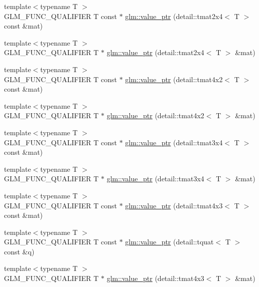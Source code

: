\begin{DoxyCompactItemize}
\item 
{\footnotesize template$<$typename T $>$ }\\G\+L\+M\+\_\+\+F\+U\+N\+C\+\_\+\+Q\+U\+A\+L\+I\+F\+I\+E\+R T const $\ast$ \hyperlink{group__gtc__type__ptr_ga6b5545ede3accc40f90aa05014406bcf}{glm\+::value\+\_\+ptr} (detail\+::tmat2x4$<$ T $>$ const \&mat)
\item 
{\footnotesize template$<$typename T $>$ }\\G\+L\+M\+\_\+\+F\+U\+N\+C\+\_\+\+Q\+U\+A\+L\+I\+F\+I\+E\+R T $\ast$ \hyperlink{group__gtc__type__ptr_gad3ffa3b03348e1c71b509023d0e48436}{glm\+::value\+\_\+ptr} (detail\+::tmat2x4$<$ T $>$ \&mat)
\item 
{\footnotesize template$<$typename T $>$ }\\G\+L\+M\+\_\+\+F\+U\+N\+C\+\_\+\+Q\+U\+A\+L\+I\+F\+I\+E\+R T const $\ast$ \hyperlink{group__gtc__type__ptr_ga8278dac512c3e2c638b6713d63c728bb}{glm\+::value\+\_\+ptr} (detail\+::tmat4x2$<$ T $>$ const \&mat)
\item 
{\footnotesize template$<$typename T $>$ }\\G\+L\+M\+\_\+\+F\+U\+N\+C\+\_\+\+Q\+U\+A\+L\+I\+F\+I\+E\+R T $\ast$ \hyperlink{group__gtc__type__ptr_gab70c3bd4e9be92b0c9b9668744f0b5c8}{glm\+::value\+\_\+ptr} (detail\+::tmat4x2$<$ T $>$ \&mat)
\item 
{\footnotesize template$<$typename T $>$ }\\G\+L\+M\+\_\+\+F\+U\+N\+C\+\_\+\+Q\+U\+A\+L\+I\+F\+I\+E\+R T const $\ast$ \hyperlink{group__gtc__type__ptr_gaa38c5a2be6c64a69e7e5d64b70137e1c}{glm\+::value\+\_\+ptr} (detail\+::tmat3x4$<$ T $>$ const \&mat)
\item 
{\footnotesize template$<$typename T $>$ }\\G\+L\+M\+\_\+\+F\+U\+N\+C\+\_\+\+Q\+U\+A\+L\+I\+F\+I\+E\+R T $\ast$ \hyperlink{group__gtc__type__ptr_ga7a9cf1d2fb02f56ba01e27ad528aac7d}{glm\+::value\+\_\+ptr} (detail\+::tmat3x4$<$ T $>$ \&mat)
\item 
{\footnotesize template$<$typename T $>$ }\\G\+L\+M\+\_\+\+F\+U\+N\+C\+\_\+\+Q\+U\+A\+L\+I\+F\+I\+E\+R T const $\ast$ \hyperlink{group__gtc__type__ptr_gacca7d201301551a24dbf7eef343a14c1}{glm\+::value\+\_\+ptr} (detail\+::tmat4x3$<$ T $>$ const \&mat)
\item 
{\footnotesize template$<$typename T $>$ }\\G\+L\+M\+\_\+\+F\+U\+N\+C\+\_\+\+Q\+U\+A\+L\+I\+F\+I\+E\+R T const $\ast$ \hyperlink{group__gtc__type__ptr_ga348519eaf9bb56244727eabb314f6892}{glm\+::value\+\_\+ptr} (detail\+::tquat$<$ T $>$ const \&q)
\item 
{\footnotesize template$<$typename T $>$ }\\G\+L\+M\+\_\+\+F\+U\+N\+C\+\_\+\+Q\+U\+A\+L\+I\+F\+I\+E\+R T $\ast$ \hyperlink{group__gtc__type__ptr_gae821d2d76715dfe8eb4a9c7eac845dc4}{glm\+::value\+\_\+ptr} (detail\+::tmat4x3$<$ T $>$ \&mat)
\end{DoxyCompactItemize}


